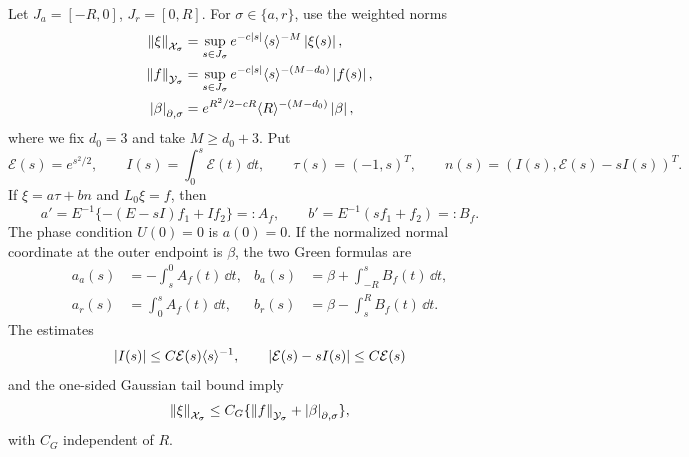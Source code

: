 Let \(J_a=[-R,0]\), \(J_r=[0,R]\).  For \(\sigma\in\{a,r\}\), use
the weighted norms
\begin{align}
 \left\lVert\xi\right\rVert_{\mathcal X_\sigma}
 &=\sup_{s\in J_\sigma}
 e^{-c\left\lvert s\right\rvert}\langle s\rangle^{-M}\left\lvert\xi(s)\right\rvert,
 \label{eq:supp-trace-state-norm}\\
 \left\lVert f\right\rVert_{\mathcal Y_\sigma}
 &=\sup_{s\in J_\sigma}
 e^{-c\left\lvert s\right\rvert}\langle s\rangle^{-(M-d_0)}\left\lvert f(s)\right\rvert,
 \label{eq:supp-trace-source-norm}\\
 \left\lvert\beta\right\rvert_{\partial,\sigma}
 &=e^{R^2/2-cR}\langle R\rangle^{-(M-d_0)}\left\lvert\beta\right\rvert,
 \label{eq:supp-trace-endpoint-norm}
\end{align}
where we fix \(d_0=3\) and take \(M\ge d_0+3\).  Put
\begin{equation}
 \mathcal E(s)=e^{s^2/2},\qquad I(s)=\int_0^s\mathcal E(t)\,\dd t,\qquad
 \tau(s)=(-1,s)^T,\qquad
 n(s)=(I(s),\mathcal E(s)-sI(s))^T.
 \label{eq:supp-fold-fundamental-pair}
\end{equation}
If \(\xi=a\tau+bn\) and \(L_0\xi=f\), then
\begin{equation}
 a'=E^{-1}\{-(E-sI)f_1+If_2\}=:A_f,\qquad
 b'=E^{-1}(sf_1+f_2)=:B_f.
 \label{eq:supp-ab-equations}
\end{equation}
The phase condition \(U(0)=0\) is \(a(0)=0\).  If the normalized normal
coordinate at the outer endpoint is \(\beta\), the two Green formulas are
\begin{align}
 a_a(s)&=-\int_s^0A_f(t)\,\dd t,
 &b_a(s)&=\beta+\int_{-R}^sB_f(t)\,\dd t,
 \label{eq:supp-left-green}\\
 a_r(s)&=\int_0^sA_f(t)\,\dd t,
 &b_r(s)&=\beta-\int_s^RB_f(t)\,\dd t.
 \label{eq:supp-right-green}
\end{align}
The estimates
\begin{equation}
 \left\lvert I(s)\right\rvert\le C\mathcal E(s)\langle s\rangle^{-1},\qquad
 \left\lvert\mathcal E(s)-sI(s)\right\rvert\le C\mathcal E(s)
 \label{eq:supp-I-estimates}
\end{equation}
and the one-sided Gaussian tail bound imply
\begin{equation}
 \left\lVert\xi\right\rVert_{\mathcal X_\sigma}
 \le C_G\{\left\lVert f\right\rVert_{\mathcal Y_\sigma}
                    +\left\lvert\beta\right\rvert_{\partial,\sigma}\},
 \label{eq:supp-one-sided-green-bound}
\end{equation}
with \(C_G\) independent of \(R\).

